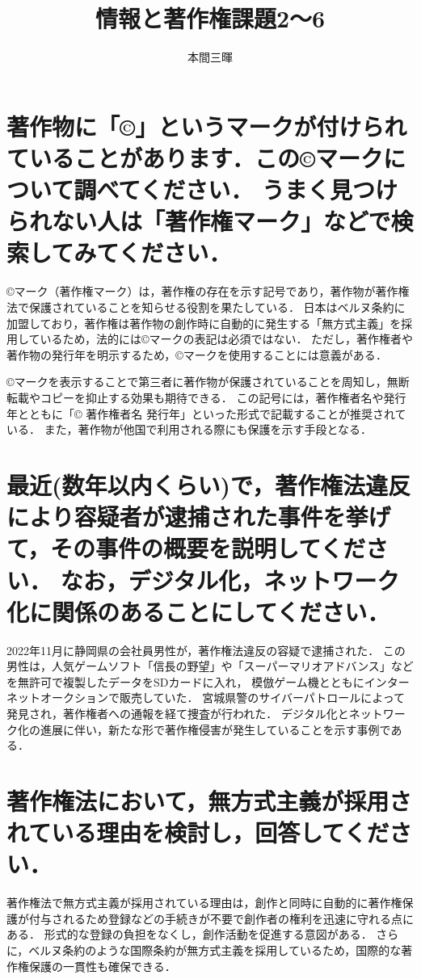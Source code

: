 \documentclass[titlepage,a4paper]{jsarticle}
\title{情報と著作権課題2〜6}
\author{本間三暉}
\begin{document}
\maketitle
\section{著作物に「©」というマークが付けられていることがあります．この©マークについて調べてください．
  うまく見つけられない人は「著作権マーク」などで検索してみてください．}
©マーク（著作権マーク）は，著作権の存在を示す記号であり，著作物が著作権法で保護されていることを知らせる役割を果たしている．
日本はベルヌ条約に加盟しており，著作権は著作物の創作時に自動的に発生する「無方式主義」を採用しているため，法的には©マークの表記は必須ではない．
ただし，著作権者や著作物の発行年を明示するため，©マークを使用することには意義がある\cite{utility}\cite{authense}．

©マークを表示することで第三者に著作物が保護されていることを周知し，無断転載やコピーを抑止する効果も期待できる\cite{ameni}．
この記号には，著作権者名や発行年とともに「© 著作権者名 発行年」といった形式で記載することが推奨されている\cite{canvas}．
また，著作物が他国で利用される際にも保護を示す手段となる\cite{tarunk}．
\section{最近(数年以内くらい)で，著作権法違反により容疑者が逮捕された事件を挙げて，その事件の概要を説明してください．
  なお，デジタル化，ネットワーク化に関係のあることにしてください．}
2022年11月に静岡県の会社員男性が，著作権法違反の容疑で逮捕された\cite{ACCS}．
この男性は，人気ゲームソフト「信長の野望」や「スーパーマリオアドバンス」などを無許可で複製したデータをSDカードに入れ，
模倣ゲーム機とともにインターネットオークションで販売していた．
宮城県警のサイバーパトロールによって発見され，著作権者への通報を経て捜査が行われた．
デジタル化とネットワーク化の進展に伴い，新たな形で著作権侵害が発生していることを示す事例である．
\section{著作権法において，無方式主義が採用されている理由を検討し，回答してください．}
著作権法で無方式主義が採用されている理由は，創作と同時に自動的に著作権保護が付与されるため登録などの手続きが不要で創作者の権利を迅速に守れる点にある．
形式的な登録の負担をなくし，創作活動を促進する意図がある．
さらに，ベルヌ条約のような国際条約が無方式主義を採用しているため，国際的な著作権保護の一貫性も確保できる．
\end{document}
